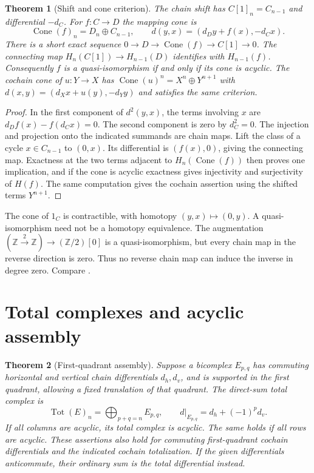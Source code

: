 \documentclass[11pt,oneside,openany]{book}
\newtheorem{theorem}{Theorem}[chapter]
\theoremstyle{definition}
\theoremstyle{remark}
\begin{document}
\begin{theorem}[Shift and cone criterion]
\label{p103:ALG-10-C01-S01}
The chain shift has \(C[1]_n=C_{n-1}\) and differential \(-d_C\).
For \(f:C\to D\) the mapping cone is
\[
 \operatorname{Cone}(f)_n=D_n\oplus C_{n-1},\qquad
 d(y,x)=(d_D y+f(x),-d_C x).
\]
There is a short exact sequence \(0\to D\to\operatorname{Cone}(f)
\to C[1]\to0\). The connecting map
\(H_n(C[1])\to H_{n-1}(D)\) identifies with \(H_{n-1}(f)\).
Consequently \(f\) is a quasi-isomorphism if and only if its cone
is acyclic. The cochain cone of \(u:Y\to X\) has
\(\operatorname{Cone}(u)^n=X^n\oplus Y^{n+1}\) with
\(d(x,y)=(d_Xx+u(y),-d_Yy)\) and satisfies the same criterion.
\end{theorem}

\begin{proof}
In the first component of \(d^2(y,x)\), the terms involving \(x\)
are \(d_Df(x)-f(d_Cx)=0\). The second component is zero by \(d_C^2=0\).
The injection and projection onto the indicated summands are chain
maps. Lift the class of a cycle \(x\in C_{n-1}\) to \((0,x)\).
Its differential is \((f(x),0)\), giving the connecting map.
Exactness at the two terms adjacent to \(H_n(\operatorname{Cone}(f))\)
then proves one implication, and if the cone is acyclic exactness
gives injectivity and surjectivity of \(H(f)\). The same computation
gives the cochain assertion using the shifted terms \(Y^{n+1}\).
\end{proof}

The cone of \(1_C\) is contractible, with homotopy
\((y,x)\mapsto(0,y)\). A quasi-isomorphism need not be a homotopy
equivalence. The augmentation
\((\mathbb Z\xrightarrow{2}\mathbb Z)\to(\mathbb Z/2)[0]\)
is a quasi-isomorphism, but every chain map in the reverse direction
is zero. Thus no reverse chain map can induce the inverse in
degree zero. Compare \cite[\S1.5]{weibel}.

\section{Total complexes and acyclic assembly}

\begin{theorem}[First-quadrant assembly]
\label{p103:ALG-10-C01-S02}
Suppose a bicomplex \(E_{p,q}\) has commuting horizontal and vertical
chain differentials \(d_h,d_v\), and is supported in the first
quadrant, allowing a fixed translation of that quadrant. The
direct-sum total complex is
\[
 \operatorname{Tot}(E)_n=\bigoplus_{p+q=n} E_{p,q},
 \qquad d|_{E_{p,q}}=d_h+(-1)^p d_v .
\]
If all columns are acyclic, its total complex is acyclic. The same
holds if all rows are acyclic. These assertions also hold for
commuting first-quadrant cochain differentials and the indicated
cochain totalization. If the given differentials anticommute,
their ordinary sum is the total differential instead.
\end{theorem}
\end{document}

